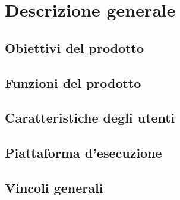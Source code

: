 \section{Descrizione generale}

\subsection{Obiettivi del prodotto}

\subsection{Funzioni del prodotto}

\subsection{Caratteristiche degli utenti}

\subsection{Piattaforma d'esecuzione}

\subsection{Vincoli generali}
